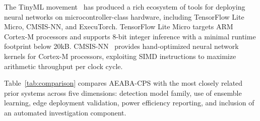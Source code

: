 \documentclass[pdflatex,sn-mathphys-num]{sn-jnl}
\theoremstyle{thmstyleone}
\theoremstyle{thmstyletwo}
\theoremstyle{thmstylethree}
\begin{document}
The TinyML movement~\cite{warden2019tinyml} has produced a rich ecosystem of tools for deploying neural networks on microcontroller-class hardware, including TensorFlow Lite Micro, CMSIS-NN, and ExecuTorch. TensorFlow Lite Micro targets ARM Cortex-M processors and supports 8-bit integer inference with a minimal runtime footprint below 20kB. CMSIS-NN~\cite{lai2018cmsis} provides hand-optimized neural network kernels for Cortex-M processors, exploiting SIMD instructions to maximize arithmetic throughput per clock cycle. 


\begin{table}[ht]
\centering
\caption{Comparison of AEABA-CPS with representative prior work.
\checkmark~= fully supported; $\circ$~= partially supported;
$\times$~= not supported.}
\label{tab:comparison}
\end{table}

Table~\ref{tab:comparison} compares AEABA-CPS with the most closely related prior systems across five dimensions: detection model family, use of ensemble learning, edge deployment validation, power efficiency reporting, and inclusion of an automated investigation component.
\end{document}
